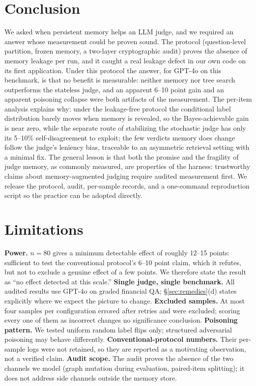 \documentclass[11pt]{article}
\begin{document}
\section{Conclusion}

We asked when persistent memory helps an LLM judge, and we required an answer whose measurement could be proven sound. The protocol (question-level partition, frozen memory, a two-layer cryptographic audit) proves the absence of memory leakage per run, and it caught a real leakage defect in our own code on its first application. Under this protocol the answer, for GPT-4o on this benchmark, is that no benefit is measurable: neither memory nor tree search outperforms the stateless judge, and an apparent 6--10 point gain and an apparent poisoning collapse were both artifacts of the measurement. The per-item analysis explains why: under the leakage-free protocol the conditional label distribution barely moves when memory is revealed, so the Bayes-achievable gain is near zero, while the separate route of stabilizing the stochastic judge has only its 5--10\% self-disagreement to exploit; the few verdicts memory does change follow the judge's leniency bias, traceable to an asymmetric retrieval setting with a minimal fix. The general lesson is that both the promise and the fragility of judge memory, as commonly measured, are properties of the harness: trustworthy claims about memory-augmented judging require audited measurement first. We release the protocol, audit, per-sample records, and a one-command reproduction script so the practice can be adopted directly.

\section*{Limitations}

\textbf{Power.} $n{=}80$ gives a minimum detectable effect of roughly 12--15 points: sufficient to test the conventional protocol's 6--10 point claim, which it refutes, but not to exclude a genuine effect of a few points. We therefore state the result as ``no effect detected at this scale.'' \textbf{Single judge, single benchmark.} All audited results use GPT-4o on graded financial QA; \S\ref{sec:remedies}(d) states explicitly where we expect the picture to change. \textbf{Excluded samples.} At most four samples per configuration errored after retries and were excluded; scoring every one of them as incorrect changes no significance conclusion. \textbf{Poisoning pattern.} We tested uniform random label flips only; structured adversarial poisoning may behave differently. \textbf{Conventional-protocol numbers.} Their per-sample logs were not retained, so they are reported as a motivating observation, not a verified claim. \textbf{Audit scope.} The audit proves the absence of the two channels we model (graph mutation during evaluation, paired-item splitting); it does not address side channels outside the memory store.
\end{document}
